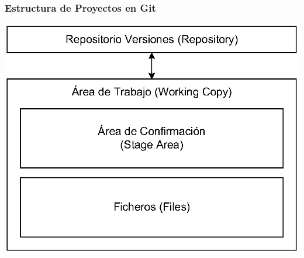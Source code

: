 \documentclass[handout,a4paper,slidestop,dvips,xcolor=pst,blue]{beamer}
\begin{document}
\begin{frame}[c]
	\frametitle{Estructura de Proyectos en Git}
	 \begin{center}
		\includegraphics[width=0.75\linewidth,keepaspectratio=true]{images/git/estructuraDirectorios.eps}
	 \end{center}
\end{frame}
\end{document}
